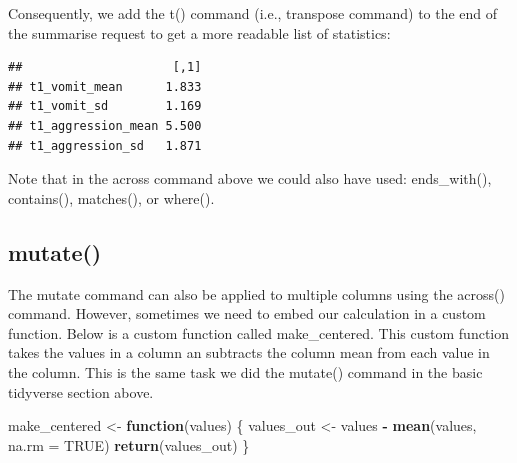 \documentclass[
]{krantz}
\makeatletter
\newenvironment{Shaded}{\begin{snugshade}}{\end{snugshade}}
\newcommand{\ControlFlowTok}[1]{\textcolor[rgb]{0.27,0.27,0.27}{\textbf{#1}}}
\newcommand{\DataTypeTok}[1]{\textcolor[rgb]{0.27,0.27,0.27}{#1}}
\newcommand{\KeywordTok}[1]{\textcolor[rgb]{0.27,0.27,0.27}{\textbf{#1}}}
\newcommand{\NormalTok}[1]{#1}
\newcommand{\OperatorTok}[1]{\textcolor[rgb]{0.43,0.43,0.43}{\textbf{#1}}}
\newcommand{\OtherTok}[1]{\textcolor[rgb]{0.37,0.37,0.37}{#1}}
\newcommand{\StringTok}[1]{\textcolor[rgb]{0.5,0.5,0.5}{#1}}
\newenvironment{kframe}{%
\medskip{}
\setlength{\fboxsep}{.8em}
 \def\at@end@of@kframe{}%
 \ifinner\ifhmode%
  \def\at@end@of@kframe{\end{minipage}}%
  \begin{minipage}{\columnwidth}%
 \fi\fi%
 \def\FrameCommand##1{\hskip\@totalleftmargin \hskip-\fboxsep
 \colorbox{shadecolor}{##1}\hskip-\fboxsep
     \hskip-\linewidth \hskip-\@totalleftmargin \hskip\columnwidth}%
 \MakeFramed {\advance\hsize-\width
   \@totalleftmargin\z@ \linewidth\hsize
   \@setminipage}}%
 {\par\unskip\endMakeFramed%
 \at@end@of@kframe}
\renewenvironment{Shaded}{\begin{kframe}}{\end{kframe}}
\makeatother
\begin{document}
Consequently, we add the t() command (i.e., transpose command) to the end of the summarise request to get a more readable list of statistics:

\begin{Shaded}
\end{Shaded}

\begin{verbatim}
##                     [,1]
## t1_vomit_mean      1.833
## t1_vomit_sd        1.169
## t1_aggression_mean 5.500
## t1_aggression_sd   1.871
\end{verbatim}

Note that in the across command above we could also have used: ends\_with(), contains(), matches(), or where().

\hypertarget{mutate-1}{%
\subsection{mutate()}\label{mutate-1}}

The mutate command can also be applied to multiple columns using the across() command. However, sometimes we need to embed our calculation in a custom function. Below is a custom function called make\_centered. This custom function takes the values in a column an subtracts the column mean from each value in the column. This is the same task we did the mutate() command in the basic tidyverse section above.

\begin{Shaded}
\begin{Highlighting}[]
\NormalTok{make_centered <-}\StringTok{ }\ControlFlowTok{function}\NormalTok{(values) \{}
\NormalTok{  values_out <-}\StringTok{ }\NormalTok{values }\OperatorTok{-}\StringTok{ }\KeywordTok{mean}\NormalTok{(values, }\DataTypeTok{na.rm =} \OtherTok{TRUE}\NormalTok{)}
  \KeywordTok{return}\NormalTok{(values_out)}
\NormalTok{\}}
\end{Highlighting}
\end{Shaded}
\end{document}
